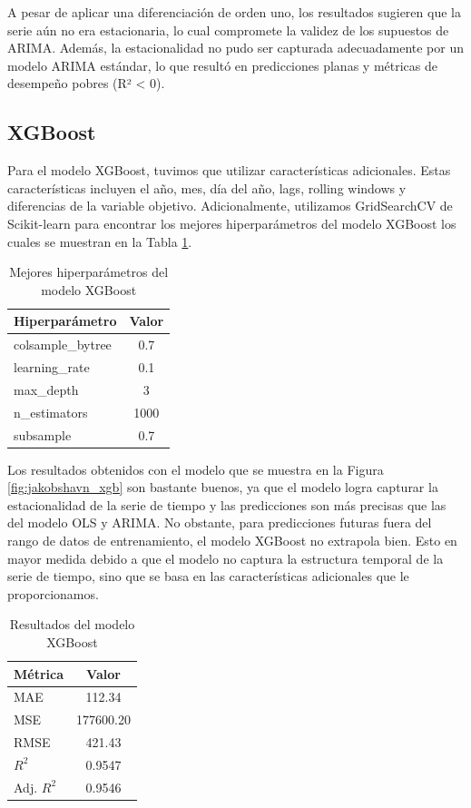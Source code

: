 \documentclass[sigconf,language=spanish]{acmart}
\begin{document}
A pesar de aplicar una diferenciación de orden uno, los resultados sugieren  que la serie aún no era estacionaria, lo cual compromete la validez de los supuestos
 de ARIMA. Además, la estacionalidad  no pudo ser capturada adecuadamente por un modelo ARIMA estándar, lo que resultó en predicciones planas y métricas
 de desempeño pobres (R² < 0).

\subsection{XGBoost}

Para el modelo XGBoost, tuvimos que utilizar características adicionales.
Estas características incluyen el año, mes, día del año, lags, rolling windows y diferencias de la variable objetivo.
Adicionalmente, utilizamos GridSearchCV de Scikit-learn \cite{Pedregosa_Scikit-learn_Machine_Learning_2011} para encontrar los mejores hiperparámetros del modelo XGBoost los cuales se muestran en la Tabla \ref{tab:xgb_params}.

\begin{table}[H]
  \caption{Mejores hiperparámetros del modelo XGBoost}
  \label{tab:xgb_params}
  \begin{tabular}{lc}
    \toprule
    Hiperparámetro & Valor \\
    \midrule
    colsample\_bytree & 0.7 \\
    learning\_rate & 0.1 \\
    max\_depth & 3 \\
    n\_estimators & 1000 \\
    subsample & 0.7 \\
    \bottomrule
  \end{tabular}
\end{table}

Los resultados obtenidos con el modelo que se muestra en la Figura \ref{fig:jakobshavn_xgb}
son bastante buenos, ya que el modelo logra capturar la estacionalidad de la serie de tiempo y las predicciones son más precisas que las del modelo OLS y ARIMA.
No obstante, para predicciones futuras fuera del rango de datos de entrenamiento, el modelo XGBoost no extrapola bien.
Esto en mayor medida debido a que el modelo no captura la estructura temporal de la serie de tiempo, sino que se basa en las características adicionales que le proporcionamos.

\begin{table}[H]
  \caption{Resultados del modelo XGBoost}
  \label{tab:xgb}
  \begin{tabular}{lc}
    \toprule
    Métrica & Valor \\
    \midrule
    MAE & 112.34 \\
    MSE & 177600.20 \\
    RMSE & 421.43 \\
    $R^2$ & 0.9547 \\
    Adj. $R^2$ & 0.9546 \\
    \bottomrule
  \end{tabular}
\end{table}
\end{document}

